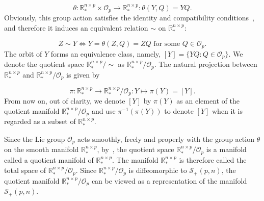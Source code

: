 \documentclass[11pt]{article}
\newcommand{\zwhcomm}[2]{{\sf\color{purple} #1}{\sf\color{blue} #2}}
\numberwithin{equation}{section}
\begin{document}
\[
  \theta :\mathbb{R}^{n\times p}_* \times \mathcal{O}_p \rightarrow \mathbb{R}^{n\times p}_*:\theta(Y,Q)=YQ.
  \]
Obviously, this group action satisfies the identity and compatibility conditions~\cite[Definition 9.11]{Boumal:300281}, and therefore it induces an equivalent relation $\sim$ on $\mathbb{R}^{n\times p}_*$: 

\[
  Z \sim Y \Leftrightarrow Y=\theta(Z,Q) = ZQ \text{ for some } Q\in \mathcal{O}_p.
  \]
The orbit of $Y$ forms an equivalence class, namely, $[Y]=\{YQ:Q\in \mathcal{O}_p\}$. We denote the quotient space $\mathbb{R}^{n\times p}_*/\sim$ as $\mathbb{R}_*^{n\times p}/\mathcal{O}_p$. The natural projection between $\mathbb{R}^{n\times p}_*$ and $\mathbb{R}_*^{n\times p}/\mathcal{O}_p$ is given by 

\[
  \pi: \mathbb{R}^{n\times p}_* \rightarrow \mathbb{R}^{n\times p}_* / \mathcal{O}_p : Y \mapsto \pi(Y)=[Y].
  \]
From now on, out of clarity, we denote $[Y]$ by $\pi(Y)$ as an element of the quotient manifold $\mathbb{R}_*^{n\times p}/\mathcal{O}_p$ and use $\pi^{-1}(\pi(Y))$ to denote $[Y]$ when it is regarded as a subset of $\mathbb{R}_*^{n\times p}$. 

Since the Lie group $\mathcal{O}_p$ acts smoothly, freely and properly with the group action $\theta$ on the smooth manifold $\mathbb{R}^{n\times p}_*$, by~\cite[Theorem 9.17]{Boumal:300281}, the quotient space $\mathbb{R}^{n\times p}_*/ \mathcal{O}_p$ is a manifold called a quotient manifold of $\mathbb{R}^{n\times p}_*$. The manifold $\mathbb{R}_*^{n \times p}$ is therefore called the total space of $\mathbb{R}^{n\times p}_*/ \mathcal{O}_p$. Since $\mathbb{R}^{n\times p}_*/\mathcal{O}_p$ is diffeomorphic to $\mathcal{S}_+(p,n)$, the quotient manifold $\mathbb{R}^{n\times p}_*/\mathcal{O}_p$ can be viewed as a representation of the manifold $\mathcal{S}_+(p,n)$. 

\end{document}
